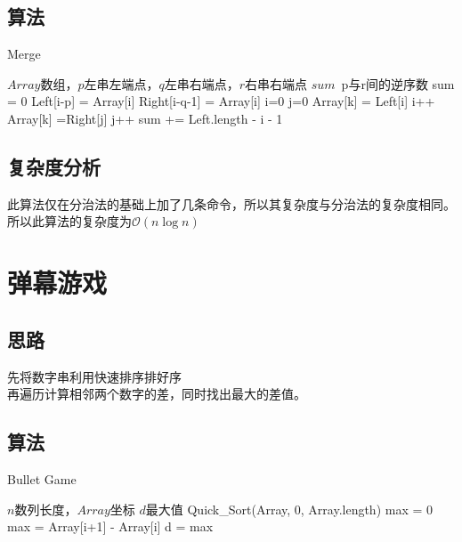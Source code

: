\documentclass[UTF8]{ctexart}
\begin{document}
\subsection{算法}
\renewcommand{\algorithmicrequire}{\textbf{输入:}}
\renewcommand{\algorithmicensure}{\textbf{输出:}}
\begin{algorithm}
	\caption{Merge}
	\begin{algorithmic}[1]
	\Require $Array$数组，$p$左串左端点，$q$左串右端点，$r$右串右端点
	\Ensure $sum$\ p与r间的逆序数
	\State sum = 0
		\State Left[i-p] = Array[i]
	\EndFor
		\State Right[i-q-1] = Array[i]
	\EndFor
	\State i=0
	\State j=0
			\State Array[k] = Left[i]
			\State i++
		\Else
			\State Array[k] =Right[j]
			\State j++
			\State sum += Left.length - i - 1
		\EndIf
	\EndFor
	\end{algorithmic}
\end{algorithm}

\subsection{复杂度分析}
此算法仅在分治法的基础上加了几条命令，所以其复杂度与分治法的复杂度相同。\\
所以此算法的复杂度为{$\mathcal{O}(n\log n)$}

\section{弹幕游戏}
\subsection{思路}
先将数字串利用快速排序排好序\\
再遍历计算相邻两个数字的差，同时找出最大的差值。
\subsection{算法}
\renewcommand{\algorithmicrequire}{\textbf{输入:}}
\renewcommand{\algorithmicensure}{\textbf{输出:}}
\begin{algorithm}
	\caption{Bullet Game}
	\begin{algorithmic}[1]
	\Require $n$数列长度，$Array$坐标
	\Ensure  $d$最大值
	\State Quick\_Sort(Array, 0, Array.length)
	\State max = 0
			\State max = Array[i+1] - Array[i]
		\EndIf
	\EndFor
	\State d = max
	\end{algorithmic}
\end{algorithm}
\end{document}
